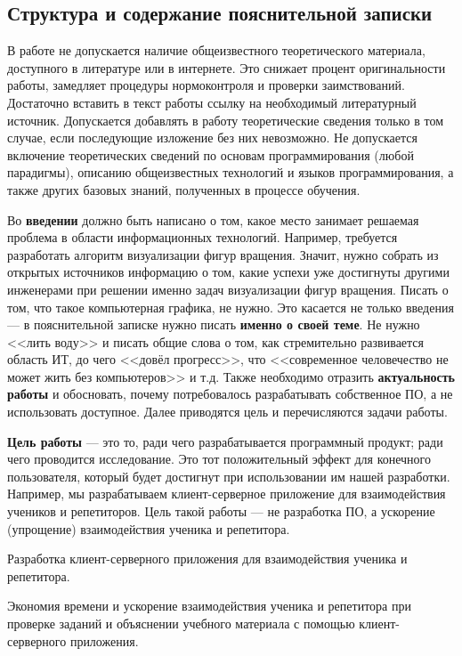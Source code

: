 \documentclass[14pt]{extarticle}
\begin{document}
\subsection{Структура и содержание пояснительной записки}
В работе не допускается наличие общеизвестного теоретического материала, доступного в литературе или в интернете. Это снижает процент оригинальности работы, замедляет процедуры нормоконтроля и проверки заимствований. Достаточно вставить в текст работы ссылку на необходимый литературный источник. Допускается добавлять в работу теоретические сведения только в том случае, если последующие изложение без них невозможно. Не допускается включение теоретических сведений по основам программирования (любой парадигмы), описанию общеизвестных технологий и языков программирования,  а также других базовых знаний,  полученных в процессе обучения.

Во { \bf введении } должно быть написано о том, какое место занимает решаемая проблема в области информационных технологий. Например, требуется разработать алгоритм визуализации фигур вращения. Значит, нужно собрать из открытых источников информацию о том, какие успехи уже достигнуты другими инженерами при решении именно задач визуализации фигур вращения. Писать о том, что такое компьютерная графика, не нужно. Это касается не только введения --- в пояснительной записке нужно писать {\bf именно о своей теме}. Не нужно <<лить воду>> и писать общие слова о том, как стремительно развивается область ИТ, до чего <<довёл прогресс>>, что <<современное человечество не может жить без компьютеров>> и т.д. Также необходимо отразить {\bf актуальность работы} и обосновать, почему потребовалось разрабатывать собственное ПО, а не использовать доступное. Далее приводятся цель и перечисляются задачи работы.

{\bf Цель работы } --- это то, ради чего разрабатывается программный продукт; ради чего проводится исследование. Это тот положительный эффект для конечного пользователя, который будет достигнут при использовании им нашей разработки. Например, мы разрабатываем клиент-серверное приложение для взаимодействия учеников и репетиторов. Цель такой работы --- не разработка ПО, а ускорение (упрощение) взаимодействия ученика и репетитора. 

\begin{tcolorbox}[colback=red!10, colframe=red!50!black, title={Пример неправильно сформулированной цели}]
	\par Разработка клиент-серверного приложения для взаимодействия ученика и репетитора.
\end{tcolorbox}
\begin{tcolorbox}[title={Пример правильно сформулированной цели}]
	\par Экономия времени и ускорение взаимодействия ученика и репетитора при проверке заданий и объяснении учебного материала с помощью клиент-серверного приложения.
\end{tcolorbox}
\end{document}
